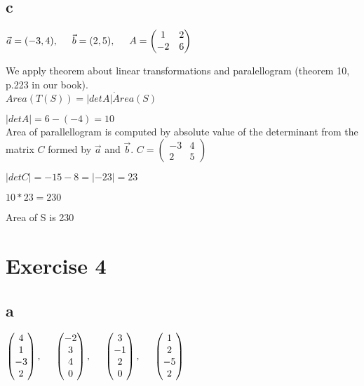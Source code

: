 \documentclass{article}
\begin{document}
\subsection*{c}
$
\vec{a} = (-3,4), \hspace{5 mm} \vec{b} = (2,5), \hspace{5 mm}
A = 
\left (
    \begin{matrix}
        1 & 2\\
        -2 & 6
    \end{matrix}
\right )
$

We apply theorem about linear transformations and paralellogram (theorem 10, p.223 in our book).\\
$Area(T(S)) = |detA| \dot Area(S)$

$|detA| = 6-(-4) = 10$\\
Area of parallellogram is computed by absolute value of the determinant from the matrix $C$ formed by $\vec{a}$ and $\vec{b}$.
$C =
\left (
    \begin{matrix}
        -3 & 4\\
        2 & 5
    \end{matrix}
\right )
$

$|detC| = -15 - 8 = |-23| = 23$

$10*23 = 230$

Area of S is 230

\newpage

\section*{Exercise 4}

\subsection*{a}
$
\left (
    \begin{matrix}
        4\\
        1\\
        -3\\
        2
    \end{matrix}
\right )
, \hspace{5 mm}
\left (
    \begin{matrix}
        -2\\
        3\\
        4\\
        0
    \end{matrix}
\right )
, \hspace{5 mm}
\left (
    \begin{matrix}
        3\\
        -1\\
        2\\
        0
    \end{matrix}
\right )
, \hspace{5 mm}
\left (
    \begin{matrix}
        1\\
        2\\
        -5\\
        2
    \end{matrix}
\right )
$
        
\end{document}
